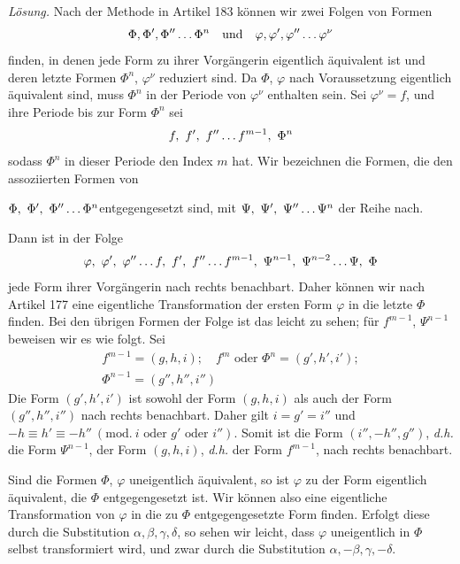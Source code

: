 \textit{Lösung.} Nach der Methode in Artikel 183 können wir zwei Folgen von Formen
\[
\Phi,\Phi',\Phi''\mathinner{\ldotp\ldotp\ldotp}\Phi^n\quad\text{und}\quad\varphi,\varphi',\varphi''\mathinner{\ldotp\ldotp\ldotp}\varphi^\nu
\]
finden, in denen jede Form zu ihrer Vorgängerin eigentlich äquivalent ist und deren letzte Formen $\Phi^n$, $\varphi^\nu$ reduziert sind. Da $\Phi$, $\varphi$ nach Voraussetzung eigentlich äquivalent sind, muss $\Phi^n$ in der Periode von $\varphi^\nu$ enthalten sein. Sei $\varphi^\nu=f$, und ihre Periode bis zur Form $\Phi^n$ sei
\[
f,\ f',\ f''\mathinner{\ldotp\ldotp\ldotp} f^{m-1},\ \Phi^n
\]
sodass $\Phi^n$ in dieser Periode den Index $m$ hat. Wir bezeichnen die Formen, die den assoziierten Formen von
\begin{center}
$\Phi,\ \Phi',\ \Phi''\mathinner{\ldotp\ldotp\ldotp}\Phi^n$\quad entgegengesetzt sind, mit $\Psi,\ \Psi',\ \Psi''\mathinner{\ldotp\ldotp\ldotp}\Psi^n$ der Reihe nach.
\end{center}
Dann ist in der Folge
\[
\varphi,\ \varphi',\ \varphi''\mathinner{\ldotp\ldotp\ldotp} f,\ f',\ f''\mathinner{\ldotp\ldotp\ldotp} f^{m-1},\ \Psi^{n-1},\ \Psi^{n-2}\mathinner{\ldotp\ldotp\ldotp}\Psi,\ \Phi
\]
jede Form ihrer Vorgängerin nach rechts benachbart. Daher können wir nach Artikel 177 eine eigentliche Transformation der ersten Form $\varphi$ in die letzte $\Phi$ finden. Bei den übrigen Formen der Folge ist das leicht zu sehen; für $f^{m-1}$, $\Psi^{n-1}$ beweisen wir es wie folgt. Sei
\[
\begin{gathered}f^{m-1}=(g,h,i);\quad f^m\text{ oder }\Phi^n=(g',h',i');\\ \Phi^{n-1}=(g'',h'',i'')\end{gathered}
\]
Die Form $(g',h',i')$ ist sowohl der Form $(g,h,i)$ als auch der Form $(g'',h'',i'')$ nach rechts benachbart. Daher gilt $i=g'=i''$ und $-h\equiv h'\equiv-h''\ (\mathrm{mod.}\ i\text{ oder }g'\text{ oder }i'')$. Somit ist die Form $(i'',-h'',g'')$, \textit{d.h.} die Form $\Psi^{n-1}$, der Form $(g,h,i)$, \textit{d.h.} der Form $f^{m-1}$, nach rechts benachbart.

Sind die Formen $\Phi$, $\varphi$ uneigentlich äquivalent, so ist $\varphi$ zu der Form eigentlich äquivalent, die $\Phi$ entgegengesetzt ist. Wir können also eine eigentliche Transformation von $\varphi$ in die zu $\Phi$ entgegengesetzte Form finden. Erfolgt diese durch die Substitution $\alpha,\beta,\gamma,\delta$, so sehen wir leicht, dass $\varphi$ uneigentlich in $\Phi$ selbst transformiert wird, und zwar durch die Substitution $\alpha,-\beta,\gamma,-\delta$.

